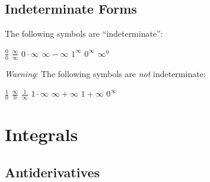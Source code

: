 \documentclass[a4paper,11pt]{article}
\begin{document}


\subsection{Indeterminate Forms}

\begin{tcolorbox}
    The following symbols are “indeterminate”:
    \begin{center}
        \begin{minipage}{10cm}
            $\frac{0}{0}$ \hspace*{\fill} $\frac{\infty}{\infty}$ \hspace*{\fill} 
            $0 \cdot \infty$ \hspace*{\fill} $\infty - \infty$ \hspace*{\fill} 
            $1^\infty$ \hspace*{\fill} $0^\infty$ \hspace*{\fill} $\infty ^ 0$
        \end{minipage}
    \end{center}
    \textit{Warning}: The following symbols are \textit{not} indeterminate:
    \begin{center}
        \begin{minipage}{10cm}
            $\frac{1}{0}$ \hspace*{\fill} $\frac{\infty}{0}$ \hspace*{\fill} 
            $\frac{1}{\infty}$ \hspace*{\fill} $1 \cdot \infty$ \hspace*{\fill} 
            $\infty + \infty$ \hspace*{\fill} $1 + \infty$ \hspace*{\fill} $0 ^ \infty$
        \end{minipage}
    \end{center}
\end{tcolorbox}




\section{Integrals}



\subsection{Antiderivatives}
\end{document}

